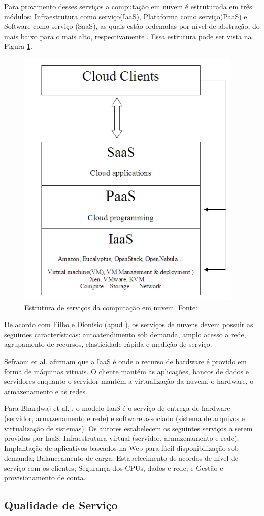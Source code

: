\documentclass[conference]{IEEEtran}
\begin{document}
Para provimento desses serviços a computação em nuvem é estruturada em três módulos: Infraestrutura como serviço(IaaS),
Plataforma como serviço(PaaS) e Software como serviço (SaaS), as quais estão ordenadas por nível de abstração, do mais baixo 
para o mais alto, respectivamente \cite{rehman2011teaching, sefraoui2012openstack, armbrust2010view, mell2011nist}. 
Essa estrutura pode ser vista na Figura \ref{fig:cloud_structure}.

\begin{figure}[ht]
\centering
\includegraphics[width=.3\textwidth]{figuras/cloud_structure.png}
\caption{Estrutura de serviços da computação em nuvem. Fonte: \cite{sefraoui2012openstack}}
\label{fig:cloud_structure}
\end{figure}

De acordo com Filho e Dionísio \cite{leite2016influencia} (apud \cite{mell2011nist}), os serviços de nuvens devem possuir as seguintes
características: autoatendimento sob demanda, amplo acesso a rede,
agrupamento de recursos, elasticidade rápida e medição de serviço.

Sefraoui et al. \cite{sefraoui2012openstack} afirmam que a IaaS é onde o recurso de hardware é provido em forma de máquinas vituais. 
O cliente mantém as aplicações, bancos de dados e servidores enquanto o servidor mantém a virtualização da nuvem, 
o hardware, o armazenamento e as redes. 

Para Bhardwaj et al. \cite{bhardwaj2010cloud}, o modelo IaaS é o serviço de entrega de hardware 
(servidor, armazenamento e rede) e software associado (sistema de arquivos e virtualização de sistemas). Os autores estabelecem
os seguintes serviços a serem providos  por IaaS: Infraestrutura virtual (servidor, armazenamento e rede);
Implantação de aplicativos baseados na Web para fácil disponibilização sob demanda; Balanceamento de carga; 
Estabelecimento de acordos de nível de serviço com os clientes;  Segurança dos CPUs, dados e rede;
e Gestão e provisionamento de conta.

\subsection{Qualidade de Serviço}
\end{document}
